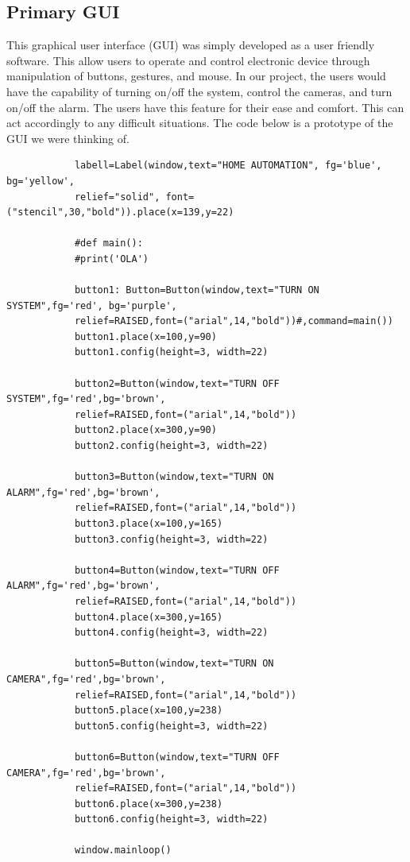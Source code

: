 	\subsection{Primary GUI}
			\par This graphical user interface (GUI) was simply developed as a user friendly software. This allow users to operate and control electronic device through manipulation of buttons, gestures, and mouse. In our project, the users would have the capability of turning on/off the system, control the cameras, and turn on/off the alarm. The users have this feature for their ease and comfort. This can act accordingly to any difficult situations. The code below is a prototype of the GUI we were thinking of.  
			\begin{lstlisting}
			labell=Label(window,text="HOME AUTOMATION", fg='blue', bg='yellow', 
			relief="solid", font=("stencil",30,"bold")).place(x=139,y=22)
			
			#def main():
			#print('OLA')
			
			button1: Button=Button(window,text="TURN ON SYSTEM",fg='red', bg='purple',
			relief=RAISED,font=("arial",14,"bold"))#,command=main())
			button1.place(x=100,y=90)
			button1.config(height=3, width=22)
			
			button2=Button(window,text="TURN OFF SYSTEM",fg='red',bg='brown',
			relief=RAISED,font=("arial",14,"bold"))
			button2.place(x=300,y=90)
			button2.config(height=3, width=22)
			
			button3=Button(window,text="TURN ON ALARM",fg='red',bg='brown',
			relief=RAISED,font=("arial",14,"bold"))
			button3.place(x=100,y=165)
			button3.config(height=3, width=22)
			
			button4=Button(window,text="TURN OFF ALARM",fg='red',bg='brown',
			relief=RAISED,font=("arial",14,"bold"))
			button4.place(x=300,y=165)
			button4.config(height=3, width=22)
			
			button5=Button(window,text="TURN ON CAMERA",fg='red',bg='brown',
			relief=RAISED,font=("arial",14,"bold"))
			button5.place(x=100,y=238)
			button5.config(height=3, width=22)
			
			button6=Button(window,text="TURN OFF CAMERA",fg='red',bg='brown',
			relief=RAISED,font=("arial",14,"bold"))
			button6.place(x=300,y=238)
			button6.config(height=3, width=22)
			
			window.mainloop()
			\end{lstlisting}
		
